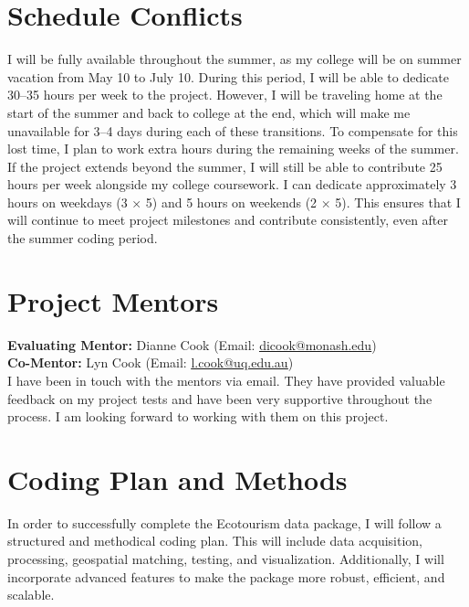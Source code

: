 \documentclass{article}
\begin{document}
\section{Schedule Conflicts}
I will be fully available throughout the summer, as my college will be on summer vacation from May 10 to July 10. During this period, I will be able to dedicate 30–35 hours per week to the project. However, I will be traveling home at the start of the summer and back to college at the end, which will make me unavailable for 3–4 days during each of these transitions. To compensate for this lost time, I plan to work extra hours during the remaining weeks of the summer. \\

If the project extends beyond the summer, I will still be able to contribute 25 hours per week alongside my college coursework. I can dedicate approximately 3 hours on weekdays (3 × 5) and 5 hours on weekends (2 × 5). This ensures that I will continue to meet project milestones and contribute consistently, even after the summer coding period.

\section{Project Mentors}
{\bfseries Evaluating Mentor:} Dianne Cook (Email: \uline{\href{mailto:dicook@monash.edu}{dicook@monash.edu}}) \\[0.2cm]
{\bfseries Co-Mentor:} Lyn Cook (Email: \uline{\href{mailto:l.cook@uq.edu.au}{l.cook@uq.edu.au}}) \\[0.2cm]
I have been in touch with the mentors via email. They have provided valuable feedback on my project tests and have been very supportive throughout the process. I am looking forward to working with them on this project.

\section{Coding Plan and Methods}

In order to successfully complete the Ecotourism data package, I will follow a structured and methodical coding plan. This will include data acquisition, processing, geospatial matching, testing, and visualization. Additionally, I will incorporate advanced features to make the package more robust, efficient, and scalable.
\end{document}
